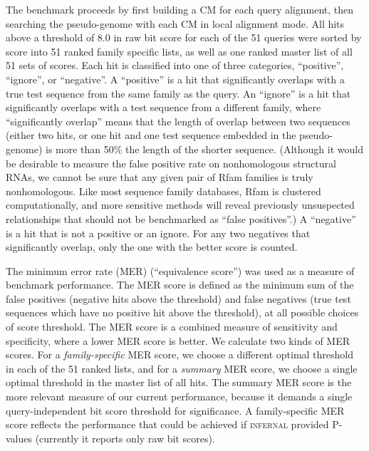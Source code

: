 \documentclass[11pt]{article}
\newif\ifdraft
\begin{document}
\ifdraft

\fi

The benchmark proceeds by first building a CM for each query
alignment, then searching the pseudo-genome with each CM in local
alignment mode. All hits above a threshold of 8.0 in raw bit score for
each of the 51 queries were sorted by score into 51 ranked family
specific lists, as well as one ranked master list of all 51 sets of
scores.  Each hit is classified into one of three categories,
``positive'', ``ignore'', or ``negative''. A ``positive'' is a hit
that significantly overlaps with a true test sequence from the same
family as the query.  An ``ignore'' is a hit that significantly
overlaps with a test sequence from a different family, where
``significantly overlap'' means that the length of overlap between two
sequences (either two hits, or one hit and one test sequence embedded
in the pseudo-genome) is more than 50\% the length of the shorter
sequence.  (Although it would be desirable to measure the false
positive rate on nonhomologous structural RNAs, we cannot be sure that
any given pair of Rfam families is truly nonhomologous. Like most
sequence family databases, Rfam is clustered computationally, and more
sensitive methods will reveal previously unsuspected relationships
that should not be benchmarked as ``false positives''.)  A
``negative'' is a hit that is not a positive or an ignore. For any two
negatives that significantly overlap, only the one with the better
score is counted.

The minimum error rate (MER) (``equivalence score'') \cite{Pearson95}
was used as a measure of benchmark performance. The MER score is
defined as the minimum sum of the false positives (negative hits above
the threshold) and false negatives (true test sequences which have no
positive hit above the threshold), at all possible choices of score
threshold. The MER score is a combined measure of sensitivity and
specificity, where a lower MER score is better. We calculate two kinds
of MER scores. For a \emph{family-specific} MER score, we choose a
different optimal threshold in each of the 51 ranked lists, and for a
\emph{summary} MER score, we choose a single optimal threshold in the
master list of all hits. The summary MER score is the more relevant
measure of our current performance, because it demands a single
query-independent bit score threshold for significance. A
family-specific MER score reflects the performance that could be
achieved if \textsc{infernal} provided P-values (currently it reports
only raw bit scores).
\end{document}
